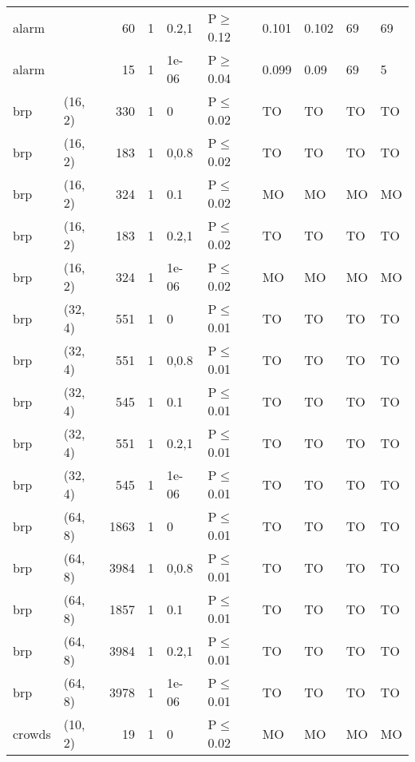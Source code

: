 \begin{longtable}{llrrllllll}
 alarm         &          &     	60 & 1 & 0.2,1 & P$\geq$0.12  & 0.101    & 0.102    & 69      & 69     \\
 alarm         &          &     	15 & 1 & 1e-06 & P$\geq$0.04  & 0.099    & 0.09     & 69      & 5      \\
 brp           & (16, 2)  &    	330 & 1 & 0     & P$\leq$0.02  & TO       & TO       & TO      & TO     \\
 brp           & (16, 2)  &    	183 & 1 & 0,0.8 & P$\leq$0.02  & TO       & TO       & TO      & TO     \\
 brp           & (16, 2)  &    	324 & 1 & 0.1   & P$\leq$0.02  & MO       & MO       & MO      & MO     \\
 brp           & (16, 2)  &    	183 & 1 & 0.2,1 & P$\leq$0.02  & TO       & TO       & TO      & TO     \\
 brp           & (16, 2)  &    	324 & 1 & 1e-06 & P$\leq$0.02  & MO       & MO       & MO      & MO     \\
 brp           & (32, 4)  &    	551 & 1 & 0     & P$\leq$0.01  & TO       & TO       & TO      & TO     \\
 brp           & (32, 4)  &    	551 & 1 & 0,0.8 & P$\leq$0.01  & TO       & TO       & TO      & TO     \\
 brp           & (32, 4)  &    	545 & 1 & 0.1   & P$\leq$0.01  & TO       & TO       & TO      & TO     \\
 brp           & (32, 4)  &    	551 & 1 & 0.2,1 & P$\leq$0.01  & TO       & TO       & TO      & TO     \\
 brp           & (32, 4)  &    	545 & 1 & 1e-06 & P$\leq$0.01  & TO       & TO       & TO      & TO     \\
 brp           & (64, 8)  &   	1863 & 1 & 0     & P$\leq$0.01  & TO       & TO       & TO      & TO     \\
 brp           & (64, 8)  &   	3984 & 1 & 0,0.8 & P$\leq$0.01  & TO       & TO       & TO      & TO     \\
 brp           & (64, 8)  &   	1857 & 1 & 0.1   & P$\leq$0.01  & TO       & TO       & TO      & TO     \\
 brp           & (64, 8)  &   	3984 & 1 & 0.2,1 & P$\leq$0.01  & TO       & TO       & TO      & TO     \\
 brp           & (64, 8)  &   	3978 & 1 & 1e-06 & P$\leq$0.01  & TO       & TO       & TO      & TO     \\
 crowds        & (10, 2)  &     	19 & 1 & 0     & P$\leq$0.02  & MO       & MO       & MO      & MO     \\

\end{longtable}
